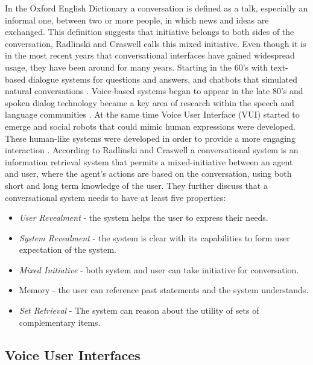 In the Oxford English Dictionary a conversation is defined as a talk, especially an informal one, between two or more people, in which news and ideas are exchanged. This definition suggests that initiative belongs to both sides of the conversation, Radlinski and Craswell \cite{radlinski2017} calls this mixed initiative. Even though it is in the most recent years that conversational interfaces have gained widespread usage, they have been around for many years. Starting in the 60's with text-based dialogue systems for questions and answers, and chatbots that simulated natural conversations \cite{mctear2016}. Voice-based systems began to appear in the late 80's and spoken dialog technology became a key area of research within the speech and language communities \cite{mctear2016}. At the same time Voice User Interface (VUI) started to emerge and social robots that could mimic human expressions were developed. These human-like systems were developed in order to provide a more engaging interaction \cite{mctear2016}. According to Radlinski and Craswell \cite{radlinski2017} a conversational system is an information retrieval system that permits a mixed-initiative between an agent and user, where the agent's actions are based on the conversation, using both short and long term knowledge of the user. They further discuss that a conversational system needs to have at least five properties:


\begin{itemize}
\item \textit{User Revealment} - the system helps the user to express their needs.
\item \textit{System Revealment} - the system is clear with its capabilities to form user expectation of the system.
\item \textit{Mixed Initiative} - both system and user can take initiative for conversation.
\item Memory - the user can reference past statements and the system understands.
\item \textit{Set Retrieval} - The system can reason about the utility of sets of complementary items.
\end{itemize}


\subsection{Voice User Interfaces}

